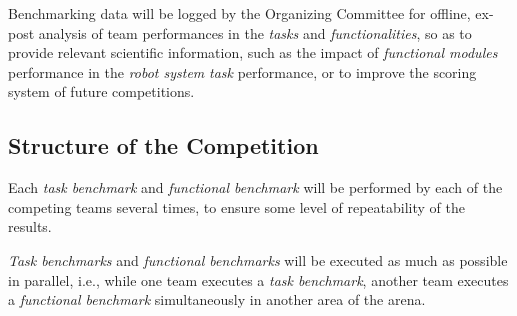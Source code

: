 Benchmarking data will be logged by the Organizing Committee for offline, ex-post analysis of team performances in the \roaw \emph{tasks} and \emph{functionalities}, so as to provide relevant scientific information, such as the impact of \emph{functional modules} performance in the \emph{robot system} \emph{task} performance, or to improve the scoring system of future \roaw competitions.

\subsection{Structure of the Competition}
\label{ssec:RoawCompStructure}

Each \emph{task benchmark} and \emph{functional benchmark} will be performed by each of the competing teams several times, to ensure some level of repeatability of the results.

\emph{Task benchmarks} and \emph{functional benchmarks} will be executed as much as possible in parallel, i.e., while one team executes a \emph{task benchmark}, another team executes a \emph{functional benchmark} simultaneously in another area of the arena.


